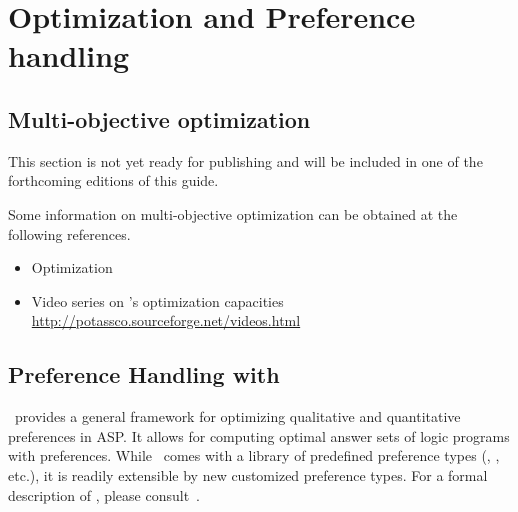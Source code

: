 
\section{Optimization and Preference handling}
\label{sec:prefopt}

\subsection{Multi-objective optimization}
\label{sec:oprimization}

This section is not yet ready for publishing
and will be included in one of the forthcoming editions of this guide.

Some information on multi-objective optimization
can be obtained at the following references.

\begin{itemize}
\item Optimization \cite{gekakasc11b,gekakasc11c,gekasc11b,ankamasc12a}
\item Video series on \clasp's optimization capacities \url{http://potassco.sourceforge.net/videos.html}
\end{itemize}

\subsection{Preference Handling with \asprin}\label{sec:asprin}
%
%
\asprin\ provides a general framework for optimizing qualitative and quantitative preferences in ASP.
It allows for computing optimal answer sets of logic programs with preferences.
While \asprin\ comes with a library of predefined preference types 
(, , etc.),
it is readily extensible by new customized preference types.
For a formal description of \asprin, please consult~\cite{brderosc15a}. 


